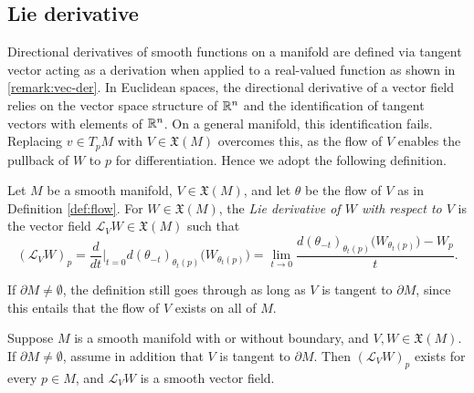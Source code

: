 
\setcounter{chapter}{1}
\setcounter{section}{1}


\subsection*{Lie derivative} %
Directional derivatives of smooth functions on a manifold are defined via tangent vector acting as a derivation when applied to a real-valued function as shown in \ref{remark:vec-der}. In Euclidean spaces, the directional derivative of a vector field relies on the vector space structure of $\mathbb{R}^n$ and the identification of tangent vectors with elements of $\mathbb{R}^n$. On a general manifold, this identification fails. Replacing $v \in T_pM$ with $V \in \mathfrak{X}(M)$ overcomes this, as the flow of $V$ enables the pullback of $W$ to $p$ for differentiation. 
Hence we adopt the following definition.

\begin{definition}\label{def:lie-der}
	Let $M$ be a smooth manifold, $V \in \mathfrak{X}(M)$, and let $\theta$ be the flow of $V$ as in Definition \ref{def:flow}. For $W \in \mathfrak{X}(M)$, the \emph{Lie derivative of $W$ with respect to $V$} is the vector field $\mathscr{L}_VW \in \mathfrak{X}(M)$ such that
	\begin{equation}
	(\mathscr{L}_VW)_p = \frac{d}{dt}\Big|_{t=0} d(\theta_{-t})_{\theta_t(p)}\big(W_{\theta_t(p)}\big) = \lim_{t\to 0} \frac{d(\theta_{-t})_{\theta_t(p)}\big(W_{\theta_t(p)}\big) - W_p}{t}. \label{eq:lie-der}
	\end{equation}
\end{definition}


If $\partial M \neq \emptyset$, the definition still goes through as long as $V$ is tangent to $\partial M$, since this entails that the flow of $V$ exists on all of $M$.

\begin{lemma}
	Suppose $M$ is a smooth manifold with or without boundary, and $V, W \in \mathfrak{X}(M)$. If $\partial M \neq \emptyset$, assume in addition that $V$ is tangent to $\partial M$. Then $(\mathscr{L}_VW)_p$ exists for every $p \in M$, and $\mathscr{L}_VW$ is a smooth vector field.
\end{lemma}

